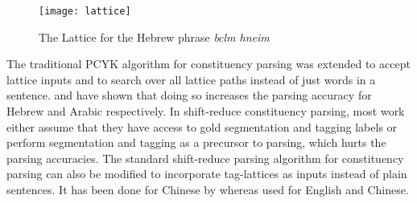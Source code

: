\begin{figure}[htb]
    \centering
    \texttt{[image: lattice]}
    \caption{The Lattice for the Hebrew phrase \textit{bclm hneim}}
    \label{fig:lattice}    
\end{figure}

The traditional PCYK algorithm for constituency parsing was extended to accept lattice inputs and to search over all lattice paths instead of just words in a sentence. \cite{goldberg:elhadad:2011} and \cite{green:manning:2010} have shown that doing so increases the parsing accuracy for Hebrew and Arabic respectively. In shift-reduce constituency parsing, most work either assume that they have access to gold segmentation and tagging labels or perform segmentation and tagging as a precursor to parsing, which hurts the parsing accuracies. The standard shift-reduce parsing algorithm for constituency parsing can also be modified to incorporate tag-lattices as inputs instead of plain sentences. It has been done for Chinese by \cite{wang2014joint} whereas \cite{mi2015shift} used for English and Chinese.